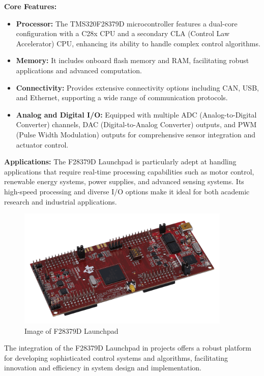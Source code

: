 \textbf{Core Features:}
\begin{itemize}
    \item \textbf{Processor:} The TMS320F28379D microcontroller features a dual-core configuration with a C28x CPU and a secondary CLA (Control Law Accelerator) CPU, enhancing its ability to handle complex control algorithms.
    \item \textbf{Memory:} It includes onboard flash memory and RAM, facilitating robust applications and advanced computation.
    \item \textbf{Connectivity:} Provides extensive connectivity options including CAN, USB, and Ethernet, supporting a wide range of communication protocols.
    \item \textbf{Analog and Digital I/O:} Equipped with multiple ADC (Analog-to-Digital Converter) channels, DAC (Digital-to-Analog Converter) outputs, and PWM (Pulse Width Modulation) outputs for comprehensive sensor integration and actuator control.
\end{itemize}

\textbf{Applications:}
The F28379D Launchpad is particularly adept at handling applications that require real-time processing capabilities such as motor control, renewable energy systems, power supplies, and advanced sensing systems. Its high-speed processing and diverse I/O options make it ideal for both academic research and industrial applications.

\begin{figure}[H]
    \centering
    \includegraphics[width=4in]{sections/section4/images/f23879d/launchxl-f28379d-angled.png}
    \caption{Image of F28379D Launchpad}
\end{figure}

The integration of the F28379D Launchpad in projects offers a robust platform for developing sophisticated control systems and algorithms, facilitating innovation and efficiency in system design and implementation.



